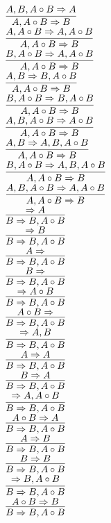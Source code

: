 \documentclass[11pt]{article}
\begin{document}
\begin{center}
\bigskip
\\$\infer{A, A\circ B\Rightarrow B}{A, B, A\circ B\Rightarrow A}$
\bigskip
\\$\infer{A, A\circ B\Rightarrow B}{A, A\circ B\Rightarrow A, A\circ B}$
\bigskip
\\$\infer{A, A\circ B\Rightarrow B}{B, A\circ B\Rightarrow A, A\circ B}$
\bigskip
\\$\infer{A, A\circ B\Rightarrow B}{A, B\Rightarrow B, A\circ B}$
\bigskip
\\$\infer{A, A\circ B\Rightarrow B}{B, A\circ B\Rightarrow B, A\circ B}$
\bigskip
\\$\infer{A, A\circ B\Rightarrow B}{A, B, A\circ B\Rightarrow A\circ B}$
\bigskip
\\$\infer{A, A\circ B\Rightarrow B}{A, B\Rightarrow A, B, A\circ B}$
\bigskip
\\$\infer{A, A\circ B\Rightarrow B}{B, A\circ B\Rightarrow A, B, A\circ B}$
\bigskip
\\$\infer{A, A\circ B\Rightarrow B}{A, B, A\circ B\Rightarrow A, A\circ B}$
\bigskip
\\$\infer{B\Rightarrow B, A\circ B}{\Rightarrow A}$
\bigskip
\\$\infer{B\Rightarrow B, A\circ B}{\Rightarrow B}$
\bigskip
\\$\infer{B\Rightarrow B, A\circ B}{A\Rightarrow }$
\bigskip
\\$\infer{B\Rightarrow B, A\circ B}{B\Rightarrow }$
\bigskip
\\$\infer{B\Rightarrow B, A\circ B}{\Rightarrow A\circ B}$
\bigskip
\\$\infer{B\Rightarrow B, A\circ B}{A\circ B\Rightarrow }$
\bigskip
\\$\infer{B\Rightarrow B, A\circ B}{\Rightarrow A, B}$
\bigskip
\\$\infer{B\Rightarrow B, A\circ B}{A\Rightarrow A}$
\bigskip
\\$\infer{B\Rightarrow B, A\circ B}{B\Rightarrow A}$
\bigskip
\\$\infer{B\Rightarrow B, A\circ B}{\Rightarrow A, A\circ B}$
\bigskip
\\$\infer{B\Rightarrow B, A\circ B}{A\circ B\Rightarrow A}$
\bigskip
\\$\infer{B\Rightarrow B, A\circ B}{A\Rightarrow B}$
\bigskip
\\$\infer{B\Rightarrow B, A\circ B}{B\Rightarrow B}$
\bigskip
\\$\infer{B\Rightarrow B, A\circ B}{\Rightarrow B, A\circ B}$
\bigskip
\\$\infer{B\Rightarrow B, A\circ B}{A\circ B\Rightarrow B}$

\end{center}
\end{document}
